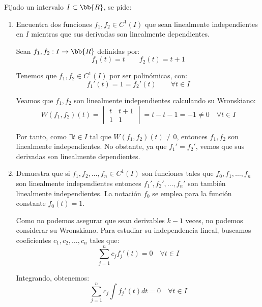 \begin{ejercicio}\label{ej:4.10} Fijado un intervalo $I\subset \bb{R}$, se pide:
    \begin{enumerate}
        \item Encuentra dos funciones $f_1, f_2 \in C^1(I)$ que sean linealmente independientes en $I$ mientras que sus derivadas son linealmente dependientes.
        
        Sean $f_1,f_2:I\to \bb{R}$ definidas por:
        \begin{equation*}
            f_1(t)=t\qquad f_2(t)=t+1
        \end{equation*}

        Tenemos que $f_1,f_2\in C^1(I)$ por ser polinómicas, con:
        \begin{equation*}
            f_1'(t)=1=f_2'(t)\qquad \forall t\in I
        \end{equation*}

        Veamos que $f_1,f_2$ son linealmente independientes calculando su Wronskiano:
        \begin{equation*}
            W(f_1,f_2)(t)=\begin{vmatrix}
                t & t+1\\
                1 & 1
            \end{vmatrix}=t-t-1=-1\neq 0 \quad \forall t\in I
        \end{equation*}

        Por tanto, como $\exists t\in I$ tal que $W(f_1,f_2)(t)\neq 0$, entonces $f_1,f_2$ son linealmente independientes. No obstante, ya que $f_1'=f_2'$, vemos que sus derivadas son linealmente dependientes.
        \item Demuestra que si $f_1, f_2, \ldots, f_n \in C^1(I)$ son funciones tales que $f_0, f_1, \ldots, f_n$ son linealmente independientes entonces $f_1', f_2', \ldots, f_n'$ son también linealmente independientes. La notación $f_0$ se emplea para la función constante $f_0(t)=1$.
        
        Como no podemos asegurar que sean derivables $k-1$ veces, no podemos considerar su Wronskiano.
        Para estudiar su independencia lineal, buscamos coeficientes $c_1,c_2,\dots,c_n$ tales que:
        \begin{equation*}
            \sum_{j=1}^n c_jf_j'(t)=0 \quad \forall t\in I
        \end{equation*}

        Integrando, obtenemos:
        \begin{equation*}
            \sum_{j=1}^n c_j\int f_j'(t)dt=0 \quad \forall t\in I
        \end{equation*}


\end{enumerate}
\end{ejercicio}
